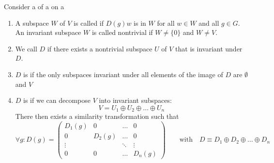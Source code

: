 \begin{definition}
Consider a  of a  on a 
\begin{enumerate}
\item A subspace $W$ of $V$ is called  if $D(g)w$ is in $W$ for all $w \in W$ and all $g \in G$. An invariant subspace $W$ is called nontrivial if $W\neq\{0\}$ and $W \neq V$.
\item We call $D$  if there exists a nontrivial subspace $U$ of $V$ that is invariant under $D$.
\item $D$ is  if the only subspaces invariant under all elements of the image of $D$ are $\emptyset$ and $V$
\item $D$ is  if we can decompose $V$ into invariant subspaces:
\[V = U_1\oplus U_2 \oplus \ldots \oplus U_n\]
There then exists a similarity transformation such that
\[\forall g: D(g) = \begin{pmatrix}
D_1(g) & 0 & \dots & 0\\
0 & D_2(g)  & \dots & 0\\
\vdots & & \ddots & \vdots\\
0&0&\dots&D_n(g)
\end{pmatrix}\qquad \text{with}\quad D \equiv D_1\oplus D_2 \oplus \ldots \oplus D_n\]
\end{enumerate}
\end{definition}

